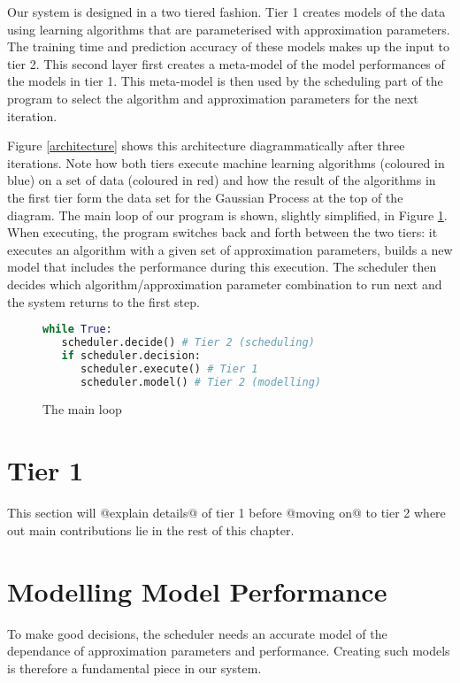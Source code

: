 \documentclass[a4paper,12pt,twoside,openright]{report}
\begin{document}
Our system is designed in a two tiered fashion. Tier 1 creates models of the data using learning algorithms that are parameterised with approximation parameters. The training time and prediction accuracy of these models makes up the input to tier 2. This second layer first creates a meta-model of the model performances of the models in tier 1. This meta-model is then used by the scheduling part of the program to select the algorithm and approximation parameters for the next iteration. 

Figure \ref{architecture} shows this architecture diagrammatically after three iterations. Note how both tiers execute machine learning algorithms (coloured in blue) on a set of data (coloured in red) and how the result of the algorithms in the first tier form the data set for the Gaussian Process at the top of the diagram. The main loop of our program is shown, slightly simplified, in Figure \ref{mainloop}. When executing, the program switches back and forth between the two tiers: it executes an algorithm with a given set of approximation parameters, builds a new model that includes the performance during this execution. The scheduler then decides which algorithm/approximation parameter combination to run next and the system returns to the first step.

\begin{figure}[ht]
\begin{lstlisting}[language=Python]
while True:
   scheduler.decide() # Tier 2 (scheduling)
   if scheduler.decision:
      scheduler.execute() # Tier 1
      scheduler.model() # Tier 2 (modelling)
\end{lstlisting}
\caption{The main loop}
\label{mainloop}
\end{figure}





\section{Tier 1}
This section will @explain details@ of tier 1 before @moving on@ to tier 2 where out main contributions lie in the rest of this chapter.

\section{Modelling Model Performance}
To make good decisions, the scheduler needs an accurate model of the dependance of approximation parameters and performance. Creating such models is therefore a fundamental piece in our system.
\end{document}
